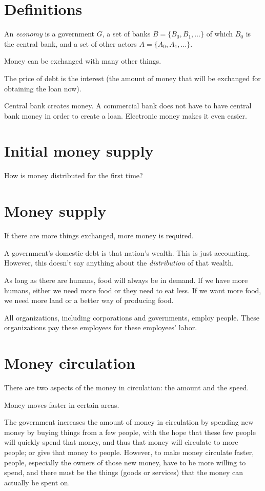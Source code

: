 \section{Definitions}

%
An \emph{economy} is a government $G$,
a set of banks $B = \{B_0,B_1,\ldots\}$ of which $B_0$ is the central bank,
and a set of other actors $A = \{A_0,A_1,\ldots\}$.

Money can be exchanged with many other things.

The price of debt is the interest
(the amount of money that will be exchanged for obtaining the loan now).

Central bank creates money.
A commercial bank does not have to have
central bank money in order to create a loan.
Electronic money makes it even easier.

\section{Initial money supply}

How is money distributed for the first time?

\section{Money supply}

If there are more things exchanged, more money is required.

A government's domestic debt is that nation's wealth.
This is just accounting.
However, this doesn't say anything about the \emph{distribution}
of that wealth.

As long as there are humans, food will always be in demand.
If we have more humans, either we need more food or they need to eat less.
If we want more food, we need more land or a better way of producing food.

All organizations, including corporations and governments, employ people.
These organizations pay these employees for these employees' labor.

\section{Money circulation}

There are two aspects of the money in circulation: the amount and the speed.

Money moves faster in certain areas.

The government increases the amount of money in circulation
by spending new money by buying things from a few people,
with the hope that these few people will quickly spend that money,
and thus that money will circulate to more people; or give that money to people.
However, to make money circulate faster,
people, especially the owners of those new money,
have to be more willing to spend,
and there must be the things (goods or services)
that the money can actually be spent on.

